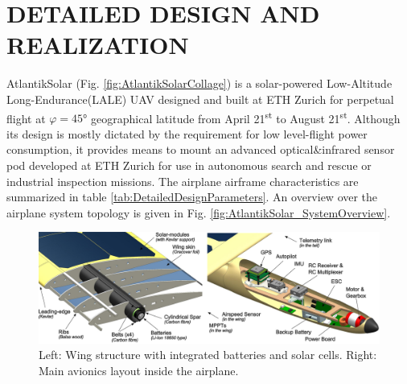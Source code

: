 \section{DETAILED DESIGN AND REALIZATION}\label{sec:detailed_design}

AtlantikSolar (Fig. \ref{fig:AtlantikSolarCollage}) is a solar-powered Low-Altitude Long-Endurance(LALE) UAV designed and built at ETH Zurich for perpetual flight at $\varphi=45°$ geographical latitude from April 21\textsuperscript{st} to August 21\textsuperscript{st}. Although its design is mostly dictated by the requirement for low level-flight power consumption, it provides means to mount an advanced optical\&infrared sensor pod developed at ETH Zurich for use in autonomous search and rescue or industrial inspection missions. The airplane airframe characteristics are summarized in table \ref{tab:DetailedDesignParameters}. An overview over the airplane system topology is given in Fig. \ref{fig:AtlantikSolar_SystemOverview}.

\begin{figure}[h]
    \centering
    \includegraphics[width=\linewidth]{images/10_CAD_AtlantikSolarAvionics_Combined}
    \caption{Left: Wing structure with integrated batteries and solar cells. Right: Main avionics layout inside the airplane.}
    \label{fig:CAD_AtlantikSolarStructureAndAvionics}
\end{figure}

